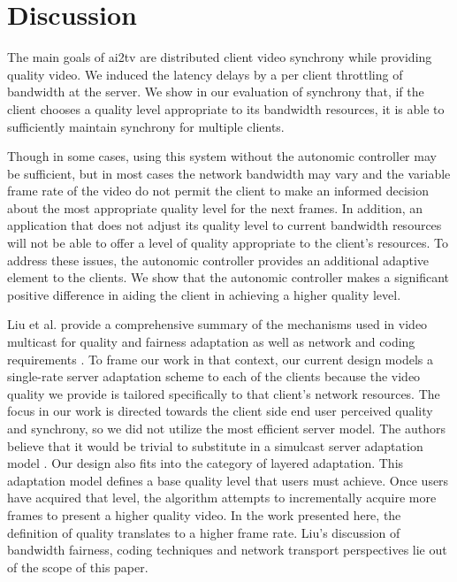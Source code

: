 \documentclass{sig-alternate}
\begin{document}


\section{Discussion} \label{discussion}

The main goals of ai2tv are distributed client video synchrony while
providing quality video.  We induced the latency delays by a per
client throttling of bandwidth at the server.  We show in our
evaluation of synchrony that, if the client chooses a quality level
appropriate to its bandwidth resources, it is able to sufficiently
maintain synchrony for multiple clients.

Though in some cases, using this system without the autonomic
controller may be sufficient, but in most cases the network bandwidth
may vary and the variable frame rate of the video do not permit the
client to make an informed decision about the most appropriate quality
level for the next frames.  In addition, an application that does not
adjust its quality level to current bandwidth resources will not be
able to offer a level of quality appropriate to the client's
resources.  To address these issues, the autonomic controller provides
an additional adaptive element to the clients.  We show that the
autonomic controller makes a significant positive difference in aiding
the client in achieving a higher quality level.

Liu et al. provide a comprehensive summary of the mechanisms used in
video multicast for quality and fairness adaptation as well as network
and coding requirements \cite{LIU}.  To frame our work in that
context, our current design models a single-rate server adaptation
scheme to each of the clients because the video quality we provide is
tailored specifically to that client's network resources.  The focus
in our work is directed towards the client side end user perceived
quality and synchrony, so we did not utilize the most efficient server
model.  The authors believe that it would be trivial to substitute in
a simulcast server adaptation model \cite{simulcast}.  Our design also
fits into the category of layered adaptation.  This adaptation model
defines a base quality level that users must achieve.  Once users have
acquired that level, the algorithm attempts to incrementally acquire
more frames to present a higher quality video.  In the work presented
here, the definition of quality translates to a higher frame rate.
Liu's discussion of bandwidth fairness, coding techniques and network
transport perspectives lie out of the scope of this paper.
\end{document}
